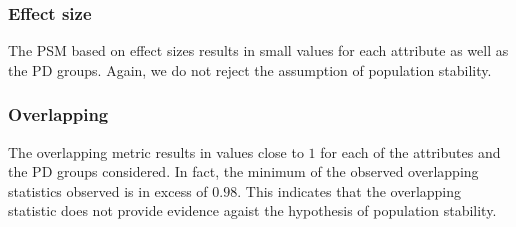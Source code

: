 \documentclass{article}
\theoremstyle{def}
\begin{document}




\subsubsection{Effect size}

The PSM based on effect sizes results in small values for each attribute as well as the PD groups. Again, we do not reject the assumption of population stability.

\subsubsection{Overlapping}

The overlapping metric results in values close to $1$ for each of the attributes and the PD groups considered. In fact, the minimum of the observed overlapping statistics observed is in excess of $0.98$. This indicates that the overlapping statistic does not provide evidence agaist the hypothesis of population stability.
\end{document}
